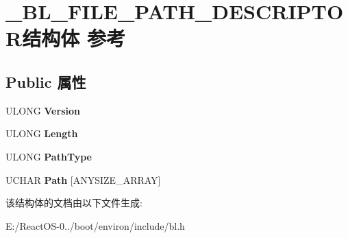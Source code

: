 \hypertarget{struct___b_l___f_i_l_e___p_a_t_h___d_e_s_c_r_i_p_t_o_r}{}\section{\+\_\+\+B\+L\+\_\+\+F\+I\+L\+E\+\_\+\+P\+A\+T\+H\+\_\+\+D\+E\+S\+C\+R\+I\+P\+T\+O\+R结构体 参考}
\label{struct___b_l___f_i_l_e___p_a_t_h___d_e_s_c_r_i_p_t_o_r}
\subsection*{Public 属性}
\begin{DoxyCompactItemize}
\item 
\mbox{\label{struct___b_l___f_i_l_e___p_a_t_h___d_e_s_c_r_i_p_t_o_r_a47a53c50386f9a3d63bebaadec887aa8}} 
U\+L\+O\+NG {\bfseries Version}
\item 
\mbox{\label{struct___b_l___f_i_l_e___p_a_t_h___d_e_s_c_r_i_p_t_o_r_a9e98156eb6294333af498af0d076aeb5}} 
U\+L\+O\+NG {\bfseries Length}
\item 
\mbox{\label{struct___b_l___f_i_l_e___p_a_t_h___d_e_s_c_r_i_p_t_o_r_aa05995e84f9a19686bfdbbb0f1c9bc3d}} 
U\+L\+O\+NG {\bfseries Path\+Type}
\item 
\mbox{\label{struct___b_l___f_i_l_e___p_a_t_h___d_e_s_c_r_i_p_t_o_r_aa8099cf0a69616b1d90b801432049dca}} 
U\+C\+H\+AR {\bfseries Path} \mbox{[}A\+N\+Y\+S\+I\+Z\+E\+\_\+\+A\+R\+R\+AY\mbox{]}
\end{DoxyCompactItemize}


该结构体的文档由以下文件生成\+:\begin{DoxyCompactItemize}
\item 
E\+:/\+React\+O\+S-\/0../boot/environ/include/bl.\+h\end{DoxyCompactItemize}

